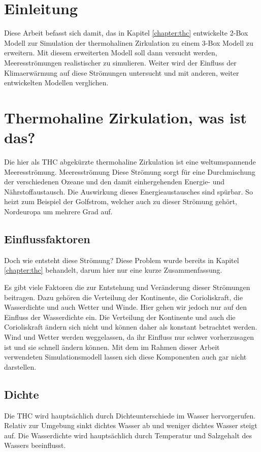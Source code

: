 \section{Einleitung}

Diese Arbeit befasst sich damit, das in Kapitel \ref{chapter:thc} entwickelte 2-Box Modell zur Simulation der thermohalinen Zirkulation zu einem 3-Box Modell zu erweitern. Mit diesem erweiterten Modell soll dann versucht werden, Meeresströmungen realistischer zu simulieren. Weiter wird der Einfluss der Klimaerwärmung auf diese Strömungen untersucht und mit anderen, weiter entwickelten Modellen verglichen.

\section{Thermohaline Zirkulation, was ist das?}

Die hier als THC abgekürzte thermohaline Zirkulation ist eine weltumspannende Meeresströmung.
Meeresströmung
%
Diese Strömung sorgt für eine Durchmischung der verschiedenen Ozeane und den damit einhergehenden Energie- und Nährstoffaustausch. 
Die Auswirkung dieses Energieaustausches sind spürbar. So heizt zum Beispiel der Golfstrom, welcher auch zu dieser Strömung gehört, Nordeuropa um mehrere Grad auf.


\subsection{Einflussfaktoren}
Doch wie entsteht diese Strömung? 
Diese Problem wurde bereits in Kapitel \ref{chapter:thc} behandelt, darum hier nur eine kurze Zusammenfassung.

Es gibt viele Faktoren die zur Entstehung und Veränderung dieser Strömungen beitragen. Dazu gehören die Verteilung der Kontinente, die Corioliskraft, die Wasserdichte und auch Wetter und Winde. Hier gehen wir jedoch nur auf den Einfluss der Wasserdichte ein.
%
Die Verteilung der Kontinente und auch die Corioliskraft ändern sich nicht und können daher als konstant betrachtet werden. Wind und Wetter werden weggelassen, da ihr Einfluss nur schwer vorherzusagen ist und sie schnell ändern können. Mit dem im Rahmen dieser Arbeit verwendeten Simulationsmodell lassen sich diese Komponenten auch gar nicht darstellen.
%

\subsection{Dichte}
%
Die THC wird hauptsächlich durch Dichteunterschiede im Wasser hervorgerufen.
Relativ zur Umgebung sinkt dichtes Wasser ab und weniger dichtes Wasser steigt auf. Die Wasserdichte wird hauptsächlich durch Temperatur und Salzgehalt des Wassers beeinflusst.

